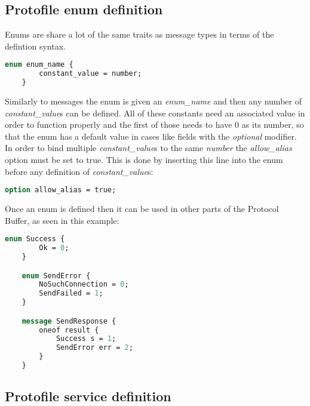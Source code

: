 \subsection{Protofile enum definition}

Enums are share a lot of the same traits as message types in terms of the defintion syntax.

\begin{minipage}{\textwidth}
\begin{lstlisting}[language=ProtoBuf, caption=Enum definition syntax in Protofiles]
    enum enum_name {
        constant_value = number;
    }
\end{lstlisting}
\end{minipage}

Similarly to messages the enum is given an \textit{enum\_name} and then any number of \textit{constant\_value}s can be defined. All of these constants need an associated
value in order to function properly and the first of those needs to have 0 as its number, so that the enum has a default value in cases like fields with the \textit{optional}
modifier. 
In order to bind multiple \textit{constant\_value}s to the same \textit{number} the \textit{allow\_alias} option must be set to true. This is done by inserting this line
into the enum before any definition of \textit{constant\_value}s:

\begin{minipage}{\textwidth}
\begin{lstlisting}[language=ProtoBuf]
    option allow_alias = true;
\end{lstlisting}
\end{minipage}

Once an enum is defined then it can be used in other parts of the Protocol Buffer, as seen in this example:

\begin{minipage}{\textwidth}
\begin{lstlisting}[language=ProtoBuf, caption=Excerpt taken from the ProtoBuf files of this project]
    enum Success {
        Ok = 0;
    }

    enum SendError {
        NoSuchConnection = 0;
        SendFailed = 1;
    }

    message SendResponse {
        oneof result {
            Success s = 1;
            SendError err = 2;
        }
    }
\end{lstlisting}
\end{minipage}

\subsection{Protofile service definition}

